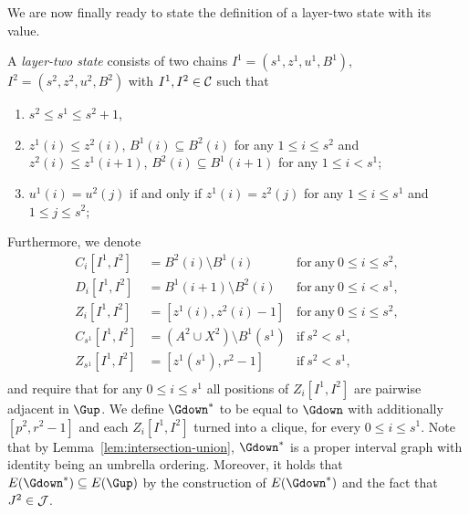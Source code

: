 We are now finally ready to state the definition of a layer-two state with its value.
\begin{definition}
A \emph{layer-two state} consists of two chains $I^1 = (s^1,z^1,u^1,B^1)$, $I^2 = (s^2,z^2,u^2,B^2)$ with $I^1,I^2 \in \mathcal{C}$ such that
\begin{enumerate}
\item $s^2 \leq s^1 \leq s^2 + 1$,
\item $z^1(i) \leq z^2(i)$, $B^1(i) \subseteq B^2(i)$ for any $1 \leq i \leq s^2$ and $z^2(i) \leq z^1(i+1)$, $B^2(i) \subseteq B^1(i+1)$ for any $1 \leq i < s^1$;
\item $u^1(i) = u^2(j)$ if and only if $z^1(i) = z^2(j)$ for any $1 \leq i \leq s^1$ and $1 \leq j \leq s^2$;
\end{enumerate}
Furthermore, we denote
\begin{align*}
C_i[I^1,I^2] &= B^2(i) \setminus B^1(i) &\mathrm{for\ any\ }0 \leq i\leq s^2,\\
D_i[I^1,I^2] &= B^1(i+1) \setminus B^2(i)&\mathrm{for\ any\ }0 \leq i < s^1,\\
Z_i[I^1,I^2] &= [z^1(i),z^2(i)-1] & \mathrm{for\ any\ }0 \leq  i \leq s^2,\\
C_{s^1}[I^1,I^2] &= (A^2 \cup X^2) \setminus B^1(s^1) &\mathrm{if\ }s^2 < s^1,\\
Z_{s^1}[I^1,I^2] &= [z^1(s^1), r^2-1] &\mathrm{if\ }s^2 < s^1,\\
\end{align*}
and require that for any $0 \leq i \leq s^1$ all positions of $Z_i[I^1,I^2]$ are pairwise adjacent in $\Gup$.
We define $\Gdown^\ast$ to be equal to $\Gdown$ with additionally $[p^2,r^2-1]$ and each $Z_i[I^1,I^2]$ turned into a clique, for every $0 \leq i \leq s^1$.
Note that by Lemma~\ref{lem:intersection-union}, $\Gdown^\ast$ is a proper interval graph with identity being an umbrella ordering. Moreover, it holds that $E(\Gdown^\ast) \subseteq E(\Gup)$ by the construction of $E(\Gdown^\ast)$ and the fact that $J^2\in \mathcal{J}$.


\end{definition}
